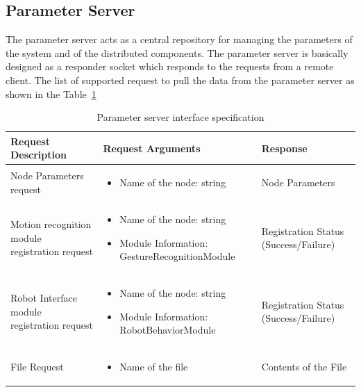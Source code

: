 \subsection*{Parameter Server} 
The parameter server acts as a central repository for managing the parameters of the system and of the distributed components. The parameter server is basically designed as a responder socket which responds to the requests from a remote client. The list of supported request to pull the data from the parameter server as shown in the Table~\ref{table:parameter_server}
\begin{table}[H]
\centering
\small
\caption{Parameter server interface specification}
\label{table:parameter_server}
\begin{tabular}{| p{3.1cm} | p{7.4cm} | p{2.8cm} |}
\hline
  \textbf{Request Description} & \textbf{Request Arguments} & \textbf{Response}
  \tabularnewline \hline
  Node Parameters request & \begin{itemize}[leftmargin=*,topsep={0pt},itemsep={0pt},partopsep={0pt},parsep={0pt}] 
                                                  \item Name of the node: string
                                                  \end{itemize} & Node Parameters 
                                          \tabularnewline\hline
                                          
  Motion recognition module registration request &  \begin{itemize}[leftmargin=*,topsep={0pt},itemsep={0pt},partopsep={0pt},parsep={0pt}] 
                                                  \item Name of the node: string
                                                  \item Module Information: GestureRecognitionModule
                                                \end{itemize} & Registration Status  (Success/Failure)
                                          \tabularnewline\hline
  
  Robot Interface module registration request & \begin{itemize}[leftmargin=*,topsep={0pt},itemsep={0pt},partopsep={0pt},parsep={0pt}] 
                                                \item Name of the node: string
                                                \item Module Information: RobotBehaviorModule 
                                            \end{itemize} & Registration Status  (Success/Failure)
                                          \tabularnewline\hline
  File Request & \begin{itemize}[leftmargin=*,topsep={0pt},itemsep={0pt},partopsep={0pt},parsep={0pt}] 
                                                  \item Name of the file
                                                  \end{itemize} & Contents of the File  
  										 \tabularnewline\hline
\end{tabular}
\end{table}
